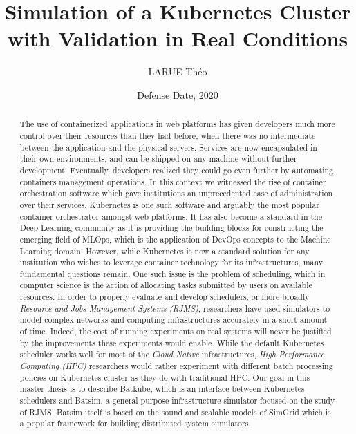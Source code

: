 \documentclass[12pt, a4paper]{memoir}
\title{Simulation of a Kubernetes Cluster with Validation in Real Conditions} %
\author{LARUE Théo}
\date{Defense Date, 2020} %
\begin{document}
\frontmatter
\begin{titlingpage}
\maketitle
\end{titlingpage}

\setlength{\parskip}{-1pt plus 1pt}

\renewcommand{\abstracttextfont}{\normalfont}
\abstractintoc
\begin{abstract} 
	The use of containerized applications in web platforms has given
	developers much more control over their resources than they had before,
	when there was no intermediate between the application and the physical
	servers. Services are now encapsulated in their own environments, and
	can be shipped on any machine without further development. Eventually,
	developers realized they could go even further by automating containers
	management operations. In this context we witnessed the rise of
	container orchestration software which gave institutions an
	unprecedented ease of administration over their services. Kubernetes is
	one such software and arguably the most popular container orchestrator
	amongst web platforms. It has also become a standard in the Deep
	Learning community as it is providing the building blocks for
	constructing the emerging field of MLOps, which is the application of
	DevOps concepts to the Machine Learning domain. However, while
	Kubernetes is now a standard solution for any institution who wishes to
	leverage container technology for its infrastructures, many fundamental
	questions remain. One such issue is the problem of scheduling, which in
	computer science is the action of allocating tasks submitted by users
	on available resources.  In order to properly evaluate and develop
	schedulers, or more broadly \textit{Resource and Jobs Management
	Systems (RJMS)}, researchers have used simulators to model complex
	networks and computing infrastructures accurately in a short amount of
	time. Indeed, the cost of running experiments on real systems will
	never be justified by the improvements these experiments would enable.
	While the default Kubernetes scheduler works well for most of the
	\textit{Cloud Native} infrastructures, \textit{High Performance
	Computing (HPC)} researchers would rather experiment with different
	batch processing policies on Kubernetes cluster as they do with
	traditional HPC. Our goal in this master thesis is to describe Batkube,
	which is an interface between Kubernetes schedulers and Batsim, a
	general purpose infrastructure simulator focused on the study of RJMS.
	Batsim itself is based on the sound and scalable models of SimGrid
	which is a popular framework for building distributed system
	simulators.
\end{abstract}
\abstractintoc
\end{document}
